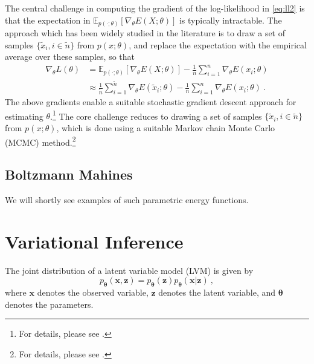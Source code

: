 \documentclass{article}
\newcommand{\x}{\mathbf{x}}
\newcommand{\z}{\mathbf{z}}
\newcommand{\ttheta}{\boldsymbol{\theta}}
\newcommand\E{\mathbb{E}}
\begin{document}
The central challenge in computing the gradient of the log-likelihood in \eqref{eq:ll2} is that the expectation in $\E_{p(\cdot;\theta)}[ \nabla_{\theta} E(X;\theta)]$ is typically intractable. The approach which has been widely studied in the literature is to draw a set of samples $\{\tilde{x}_i, i \in \tilde{n} \}$  from $p(x;\theta)$, and replace the expectation with the empirical average over these samples, so that 
\begin{align}
	\nabla_{\theta} L(\theta) & = \E_{p(\cdot;\theta)}[ \nabla_{\theta} E(X;\theta)] - \frac{1}{n} \sum_{i=1}^n \nabla_{\theta} E(x_i;\theta) \\
	& \approx \frac{1}{\tilde{n}} \sum_{i=1}^{\tilde{n}} \nabla_{\theta} E(\tilde{x}_i;\theta)  - \frac{1}{n} \sum_{i=1}^n \nabla_{\theta} E(x_i;\theta) ~.
	\label{eq:ll3}
\end{align}
The above gradients enable a suitable stochastic gradient descent approach for estimating $\theta$.\footnote{For details, please see .} The core challenge reduces to drawing  a set of samples $\{\tilde{x}_i, i \in \tilde{n} \}$  from $p(x;\theta)$, which is done using a suitable Markov chain Monte Carlo (MCMC) method.\footnote{For details, please see .}


\subsection{Boltzmann Mahines}

We will shortly see examples of such parametric energy functions.



\newpage 

\section{Variational Inference}

The joint distribution of a latent variable model (LVM) is given by
\begin{equation}
	p_{\ttheta}(\x,\z) = p_{\ttheta}(\z) p_{\ttheta}(\x|\z) ~,
\end{equation}
where $\x$ denotes the observed variable, $\z$ denotes the latent variable, and $\ttheta$ denotes the parameters.
\end{document}
